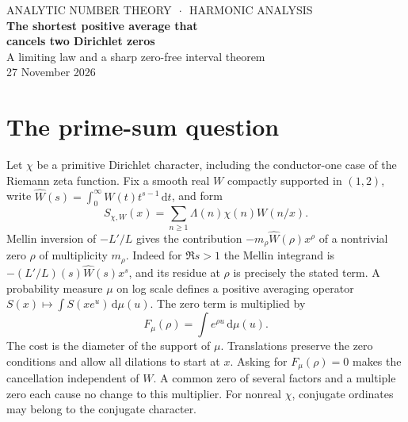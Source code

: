 \documentclass[11pt,letterpaper]{article}
\theoremstyle{remark}\newtheorem{remark}[theorem]{Remark}
\newcommand{\rd}{\,\mathrm{d}}
\begin{document}
\begin{center}
{\color{blue!40!black}\small ANALYTIC NUMBER THEORY \(\,\cdot\,\) HARMONIC ANALYSIS}\\[8pt]
{\LARGE\bfseries The shortest positive average that\\[3pt] cancels two Dirichlet zeros}\\[9pt]
{\large A limiting law and a sharp zero-free interval theorem}\\[7pt]
{\small 27 November 2026}
\end{center}
\begin{abstract}
A positive average of dilates of a prime sum can cancel the oscillations from
two prescribed zeros. We determine the least possible logarithmic span, the
unique optimal weights, and the distribution of the extra span needed for
a second zero high in the critical strip. For any fixed positive ordinate $a$,
the extra span multiplied by the second ordinate has an explicit, atomless
limiting law of full support $[0,\pi]$. Its two endpoint probabilities have
different exponents. The same law holds for each fixed primitive Dirichlet
character. In the related zero-free interval problem of Kozma and Oravecz,
we determine the wide-step limit for arbitrary arithmetic progressions of
frequencies and the sharp order of its finite-degree error. We also transfer the progression estimate to a growing collection of actual zero ordinates. The arithmetic interpretation uses the Dirichlet
critical-line theorem in the supplied Lean source.
\end{abstract}

\section{The prime-sum question}
Let $\chi$ be a primitive Dirichlet character, including the conductor-one
case of the Riemann zeta function. Fix a smooth real $W$ compactly supported
in $(1,2)$, write $\widehat W(s)=\int_0^\infty W(t)t^{s-1}\rd t$, and form
\[
 S_{\chi,W}(x)=\sum_{n\ge1}\Lambda(n)\chi(n)W(n/x).
\]
Mellin inversion of $-L'/L$ gives the contribution
$-m_\rho\widehat W(\rho)x^\rho$ of a nontrivial zero $\rho$ of
multiplicity $m_\rho$. Indeed for $\Re s>1$ the Mellin integrand is
$-(L'/L)(s)\widehat W(s)x^s$, and its residue at $\rho$ is precisely the stated term.
A probability measure $\mu$ on log scale defines a positive averaging
operator $S(x)\mapsto\int S(xe^u)\rd\mu(u)$. The zero term is multiplied by
\[
 F_\mu(\rho)=\int e^{\rho u}\rd\mu(u).
\]
The cost is the diameter of the support of $\mu$. Translations preserve the
zero conditions and allow all dilations to start at $x$. Asking for
$F_\mu(\rho)=0$ makes the cancellation independent of $W$. A common zero
of several factors and a multiple zero each cause no change to this multiplier.
For nonreal $\chi$, conjugate ordinates may belong to the conjugate character.
\end{document}
